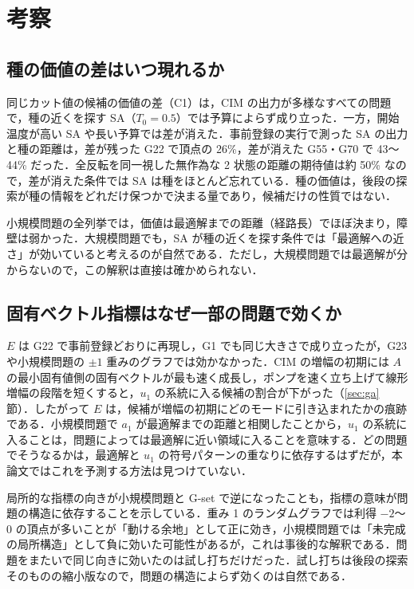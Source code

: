 \section{考察}\label{sec:discussion}

\subsection{種の価値の差はいつ現れるか}

同じカット値の候補の価値の差（C1）は，CIM の出力が多様なすべての問題で，種の近くを探す SA（$T_0=0.5$）では予算によらず成り立った．一方，開始温度が高い SA や長い予算では差が消えた．事前登録の実行で測った SA の出力と種の距離は，差が残った G22 で頂点の 26\%，差が消えた G55・G70 で 43〜44\% だった．全反転を同一視した無作為な 2 状態の距離の期待値は約 50\% なので，差が消えた条件では SA は種をほとんど忘れている．種の価値は，後段の探索が種の情報をどれだけ保つかで決まる量であり，候補だけの性質ではない．

小規模問題の全列挙では，価値は最適解までの距離（経路長）でほぼ決まり，障壁は弱かった．大規模問題でも，SA が種の近くを探す条件では「最適解への近さ」が効いていると考えるのが自然である．ただし，大規模問題では最適解が分からないので，この解釈は直接は確かめられない．

\subsection{固有ベクトル指標はなぜ一部の問題で効くか}

$E$ は G22 で事前登録どおりに再現し，G1 でも同じ大きさで成り立ったが，G23 や小規模問題の $\pm1$ 重みのグラフでは効かなかった．CIM の増幅の初期には $A$ の最小固有値側の固有ベクトルが最も速く成長し，ポンプを速く立ち上げて線形増幅の段階を短くすると，$u_1$ の系統に入る候補の割合が下がった（\ref{sec:ga} 節）．したがって $E$ は，候補が増幅の初期にどのモードに引き込まれたかの痕跡である．小規模問題で $a_1$ が最適解までの距離と相関したことから，$u_1$ の系統に入ることは，問題によっては最適解に近い領域に入ることを意味する．どの問題でそうなるかは，最適解と $u_1$ の符号パターンの重なりに依存するはずだが，本論文ではこれを予測する方法は見つけていない．

局所的な指標の向きが小規模問題と G-set で逆になったことも，指標の意味が問題の構造に依存することを示している．重み 1 のランダムグラフでは利得 $-2$〜$0$ の頂点が多いことが「動ける余地」として正に効き，小規模問題では「未完成の局所構造」として負に効いた可能性があるが，これは事後的な解釈である．問題をまたいで同じ向きに効いたのは試し打ちだけだった．試し打ちは後段の探索そのものの縮小版なので，問題の構造によらず効くのは自然である．

